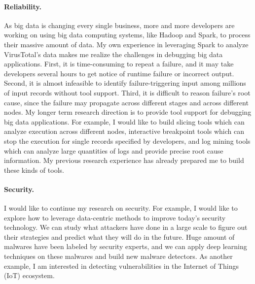 \documentclass[10pt]{article}
\begin{document}
\vspace{-.1in}
\paragraph{Reliability.} 
As big data is changing every single business, 
more and more developers are working on using big data computing systems, 
like Hadoop and Spark, to process their massive amount of data. 
My own experience in leveraging Spark to analyze VirusTotal's data 
makes me realize the challenges in debugging big data applications. 
First, it is time-consuming to repeat a failure, and it may take developers several hours to get notice of runtime failure or incorrect output.
Second, it is almost infeasible to identify failure-triggering input among millions of input records without tool support. 
Third, it is difficult to reason failure's root cause, since the failure may propagate across different stages and across different nodes. 
My longer term research direction is to provide tool support for debugging big data applications.
For example, I would like to build slicing tools which can analyze execution across different nodes, 
interactive breakpoint tools which can stop the execution for single records specified by developers, 
and log mining tools which can analyze large quantities of logs and provide precise root cause information. 
My previous research experience has already prepared me to build these kinds of tools. 

\vspace{-.1in}
\paragraph{Security.} 
I would like to continue my research on security. 
For example, I would like to explore how to leverage data-centric methods to improve today’s security technology. 
We can study what attackers have done in a large scale to figure out their strategies and predict what they will do in the future. 
Huge amount of malwares have been labeled by security experts, and we can apply deep learning techniques on these malwares and build new malware detectors. 
As another example, I am interested in detecting vulnerabilities in the Internet of Things (IoT) ecosystem. 


\newpage


\end{document}
